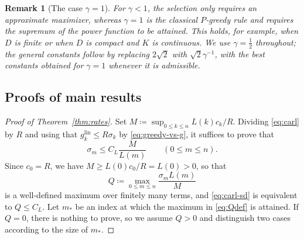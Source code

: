 \documentclass[11pt,reqno, a4paper]{article}
\numberwithin{equation}{section}
\newtheorem{remark}[theorem]{Remark}
\newcommand{\lin}{\ensuremath{\mathrm{lin}}}
\begin{document}
\begin{remark}[The case $\gamma=1$]\label{rem:gamma1}
For $\gamma<1$, the selection only requires an approximate maximizer, whereas $\gamma=1$ is the classical $P$-greedy rule and requires the supremum of the power function to be attained.
This holds, for example, when $D$ is finite or when $D$ is compact and $K$ is continuous.
We use $\gamma=\tfrac12$ throughout; the general constants follow by replacing $2\sqrt2$ with $\sqrt2\gamma^{-1}$, with the best constants obtained for $\gamma=1$ whenever it is admissible.
\end{remark}
 
\subsection{Proofs of main results}
\begin{proof}[Proof of Theorem~\ref{thm:rates}]
Set $M\coloneqq\sup_{0\le k\le n}L(k) c_k/R$.
Dividing \eqref{eq:carl} by $R$ and using that $g_k^{\lin}\le R \sigma_k$ by \eqref{eq:greedy-vs-g}, it suffices to prove that
\begin{equation}\label{eq:carl-sd}
    \sigma_m \le C_L \frac{M}{L(m)}\qquad(0\le m\le n).
\end{equation}
Since $c_0=R$, we have $M\ge L(0) c_0/R=L(0)>0$, so that
\begin{equation}\label{eq:Qdef}
    Q\coloneqq\max_{0\le m\le n}\frac{\sigma_m L(m)}{M}
\end{equation}
is a well-defined maximum over finitely many terms, and \eqref{eq:carl-sd} is equivalent to $Q\le C_L$.
Let $m_\ast$ be an index at which the maximum in \eqref{eq:Qdef} is attained.
If $Q=0$, there is nothing to prove, so we assume $Q>0$ and distinguish two cases according to the size of $m_\ast$.
 

\end{proof}
\end{document}
